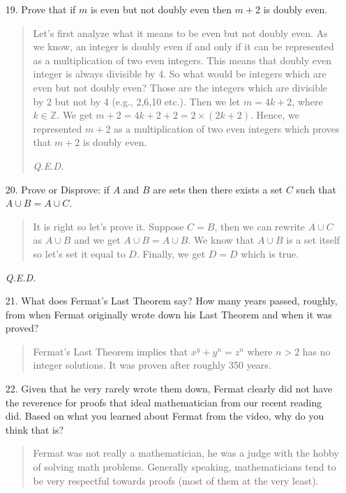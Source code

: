 \documentclass[12pt, a4paper]{article}                      %
\begin{document}
\begin{enumerate}
\item[19.]
Prove that if $m$ is even but not doubly even then $m + 2$ is doubly even.
\begin{quote}
Let's first analyze what it means to be even but not doubly even. As we know, an integer
is doubly even if and only if it can be represented as a multiplication of two even integers.
This means that doubly even integer is always divisible by 4. So what would be integers which are even
but not doubly even? Those are the integers which are divisible by 2 but not by 4 (e.g., 2,6,10 etc.).
Then we let $m = 4k + 2$, where $k \in \mathbb{Z}$. We get $m + 2 = 4k + 2 + 2 = 2 \times (2k + 2)$.
Hence, we represented $m + 2$ as a multiplication of two even integers which proves that $m + 2$ is
doubly even.
\begin{flushright}
\textit{Q.E.D.}
\end{flushright}
\end{quote}

\item[20.]
Prove or Disprove: if $A$ and $B$ are sets then there exists a set $C$ such that $A \cup B = A \cup C$.
\begin{quote}
It is right so let's prove it.
Suppose $C = B$, then we can rewrite $A \cup C$ as $A \cup B$ and we get $A \cup B = A \cup B$.
We know that $A \cup B$ is a set itself so let's set it equal to $D$. Finally, we get $D = D$ which
is true.
\end{quote}
\begin{flushright}
\textit{Q.E.D.}
\end{flushright}

\item[21.]
What does Fermat’s Last Theorem say? How many years passed, roughly, from when
Fermat originally wrote down his Last Theorem and when it was proved?
\begin{quote}
Fermat's Last Theorem implies that $x^y + y^n = z^n$ where $n > 2$ has no integer solutions.
It was proven after roughly 350 years.
\end{quote}

\item[22.]
Given that he very rarely wrote them down, Fermat clearly did not have the reverence
for proofs that ideal mathematician from our recent reading did. Based on what you
learned about Fermat from the video, why do you think that is?
\begin{quote}
Fermat was not really a mathematician, he was a judge with the hobby of solving math problems.
Generally speaking, mathematicians tend to be very respectful towards proofs (most of
them at the very least).
\end{quote}


\end{enumerate}
\end{document}
